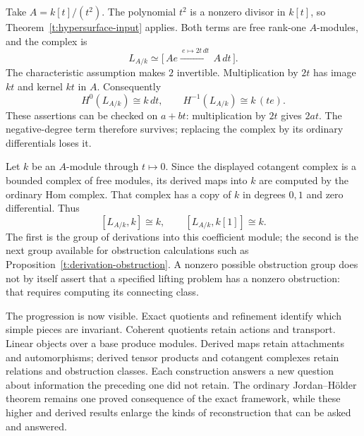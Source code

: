 \begin{example}
\label{t:cotangent-dual-numbers}
Take $A=k[t]/(t^2)$.  The polynomial $t^2$ is a nonzero divisor in
$k[t]$, so Theorem~\ref{t:hypersurface-input} applies.  Both terms are
free rank-one $A$-modules, and the complex is
\[
 L_{A/k}\simeq
 \bigl[\,A e\xrightarrow{\ e\mapsto 2t\,dt\ }A\,dt\,\bigr].
\]
The characteristic assumption makes $2$ invertible.  Multiplication by
$2t$ has image $kt$ and kernel $kt$ in $A$.  Consequently
\[
 H^0(L_{A/k})\cong k\,dt,
 \qquad H^{-1}(L_{A/k})\cong k\,(te).
\]
These assertions can be checked on $a+bt$: multiplication by $2t$
gives $2at$.  The negative-degree term therefore survives; replacing
the complex by its ordinary differentials loses it.

Let $k$ be an $A$-module through $t\mapsto0$.  Since the displayed
cotangent complex is a bounded complex of free modules, its derived
maps into $k$ are computed by the ordinary Hom complex.  That complex
has a copy of $k$ in degrees $0,1$ and zero differential.  Thus
\[
 [L_{A/k},k]\cong k,
 \qquad [L_{A/k},k[1]]\cong k.
\]
The first is the group of derivations into this coefficient module;
the second is the next group available for obstruction calculations
such as Proposition~\ref{t:derivation-obstruction}.  A nonzero possible
obstruction group does not by itself assert that a specified lifting
problem has a nonzero obstruction: that requires computing its
connecting class.
\end{example}

The progression is now visible.  Exact quotients and refinement identify
which simple pieces are invariant.  Coherent quotients retain actions and
transport.  Linear objects over a base produce modules.  Derived maps
retain attachments and automorphisms; derived tensor products and
cotangent complexes retain relations and obstruction classes.  Each
construction answers a new question about information the preceding
one did not retain.  The ordinary Jordan--H\"older theorem remains one
proved consequence of the exact framework, while these higher and
derived results enlarge the kinds of reconstruction that can be asked
and answered.
